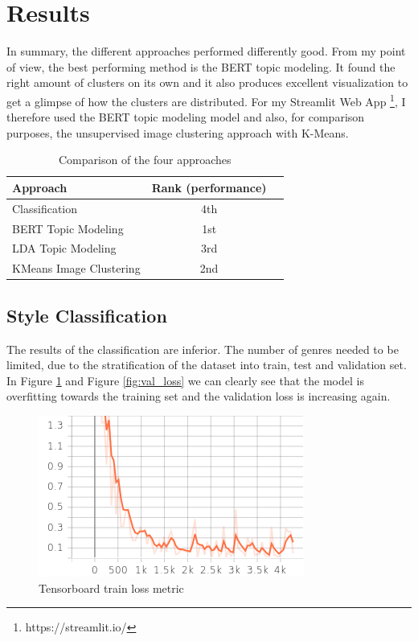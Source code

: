 \documentclass[conference]{IEEEtran}
\begin{document}
\section{Results}

In summary, the different approaches performed differently good. From my point of view, the best performing method is the BERT topic modeling. It found the right amount of clusters on its own and it also produces excellent visualization to get a glimpse of how the clusters are distributed. For my Streamlit Web App \footnote{https://streamlit.io/}, I therefore used the BERT topic modeling model and also, for comparison purposes, the unsupervised image clustering approach with K-Means.

\begin{table}[h!]
  \begin{center}
    \caption{Comparison of the four approaches}
    \label{tab:table1}
    \begin{tabular}{l|c|r} %
      \textbf{Approach} & \textbf{Rank (performance)} \\
      \hline
      Classification & 4th\\
      BERT Topic Modeling & 1st\\
      LDA Topic Modeling & 3rd\\
      KMeans Image Clustering & 2nd\\
    \end{tabular}
  \end{center}
\end{table}

\subsection{Style Classification}

The results of the classification are inferior. The number of genres needed to be limited, due to the stratification of the dataset into train, test and validation set. In Figure \ref{fig:train_loss} and Figure \ref{fig:val_loss} we can clearly see that the model is overfitting towards the training set and the validation loss is increasing again. 

\begin{figure}
\centering
\includegraphics[width=1\linewidth]{../Imgs/train_loss}
\caption{Tensorboard train loss metric}
\label{fig:train_loss}
\end{figure}
\end{document}
